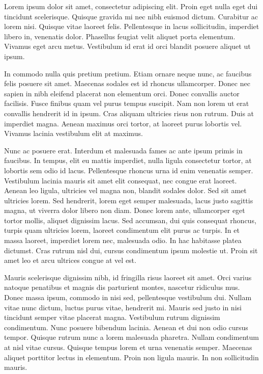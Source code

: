 

Lorem ipsum dolor sit amet, consectetur adipiscing elit. Proin eget nulla eget dui tincidunt scelerisque. Quisque gravida mi nec nibh euismod dictum. Curabitur ac lorem nisi. Quisque vitae laoreet felis. Pellentesque in lacus sollicitudin, imperdiet libero in, venenatis dolor. Phasellus feugiat velit aliquet porta elementum. Vivamus eget arcu metus. Vestibulum id erat id orci blandit posuere aliquet ut ipsum.

In commodo nulla quis pretium pretium. Etiam ornare neque nunc, ac faucibus felis posuere sit amet. Maecenas sodales est id rhoncus ullamcorper. Donec nec sapien in nibh eleifend placerat non elementum orci. Donec convallis auctor facilisis. Fusce finibus quam vel purus tempus suscipit. Nam non lorem ut erat convallis hendrerit id in ipsum. Cras aliquam ultricies risus non rutrum. Duis at imperdiet magna. Aenean maximus orci tortor, at laoreet purus lobortis vel. Vivamus lacinia vestibulum elit at maximus.

Nunc ac posuere erat. Interdum et malesuada fames ac ante ipsum primis in faucibus. In tempus, elit eu mattis imperdiet, nulla ligula consectetur tortor, at lobortis sem odio id lacus. Pellentesque rhoncus urna id enim venenatis semper. Vestibulum lacinia mauris sit amet elit consequat, nec congue erat laoreet. Aenean leo ligula, ultricies vel magna non, blandit sodales dolor. Sed sit amet ultricies lorem. Sed hendrerit, lorem eget semper malesuada, lacus justo sagittis magna, ut viverra dolor libero non diam. Donec lorem ante, ullamcorper eget tortor mollis, aliquet dignissim lacus. Sed accumsan, dui quis consequat rhoncus, turpis quam ultricies lorem, laoreet condimentum elit purus ac turpis. In et massa laoreet, imperdiet lorem nec, malesuada odio. In hac habitasse platea dictumst. Cras rutrum nisl dui, cursus condimentum ipsum molestie ut. Proin sit amet leo et arcu ultrices congue at vel est.

Mauris scelerisque dignissim nibh, id fringilla risus laoreet sit amet. Orci varius natoque penatibus et magnis dis parturient montes, nascetur ridiculus mus. Donec massa ipsum, commodo in nisi sed, pellentesque vestibulum dui. Nullam vitae nunc dictum, luctus purus vitae, hendrerit mi. Mauris sed justo in nisi tincidunt semper vitae placerat magna. Vestibulum rutrum dignissim condimentum. Nunc posuere bibendum lacinia. Aenean et dui non odio cursus tempor. Quisque rutrum nunc a lorem malesuada pharetra. Nullam condimentum at nisl vitae cursus. Quisque tempus lorem et urna venenatis semper. Maecenas aliquet porttitor lectus in elementum. Proin non ligula mauris. In non sollicitudin mauris.

